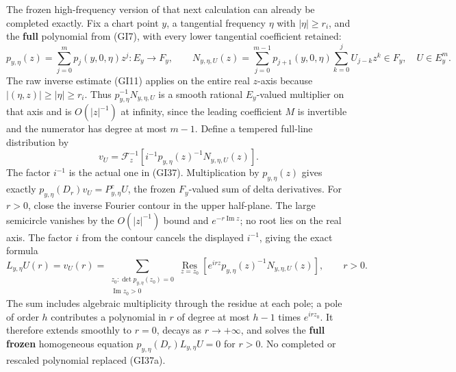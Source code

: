 \documentclass[
  11pt,
]{article}
\begin{document}
The frozen high-frequency version of that next calculation can already
be completed exactly. Fix a chart point \(y\), a tangential frequency
\(\eta\) with \(|\eta|\geq r_i\), and the \textbf{full} polynomial from
(GI7), with every lower tangential coefficient retained: \[
 p_{y,\eta}(z)=\sum_{j=0}^{m}p_j(y,0,\eta)z^j:E_y\to F_y,\qquad
 N_{y,\eta,U}(z)=
 \sum_{j=0}^{m-1}p_{j+1}(y,0,\eta)
       \sum_{k=0}^{j}U_{j-k}z^k\in F_y,\quad U\in E_y^m.
 \tag{GI37a}
\] The raw inverse estimate (GI11) applies on the entire real \(z\)-axis
because \(|(\eta,z)|\geq|\eta|\geq r_i\). Thus
\(p_{y,\eta}^{-1}N_{y,\eta,U}\) is a smooth rational \(E_y\)-valued
multiplier on that axis and is \(O(|z|^{-1})\) at infinity, since the
leading coefficient \(M\) is invertible and the numerator has degree at
most \(m-1\). Define a tempered full-line distribution by \[
 v_U=\mathcal F_z^{-1}\!\left[i^{-1}p_{y,\eta}(z)^{-1}
                         N_{y,\eta,U}(z)\right].
 \tag{GI37b}
\] The factor \(i^{-1}\) is the actual one in (GI37). Multiplication by
\(p_{y,\eta}(z)\) gives exactly \(p_{y,\eta}(D_r)v_U=P^c_{y,\eta}U\),
the frozen \(F_y\)-valued sum of delta derivatives. For \(r>0\), close
the inverse Fourier contour in the upper half-plane. The large
semicircle vanishes by the \(O(|z|^{-1})\) bound and
\(e^{-r\operatorname{Im}z}\); no root lies on the real axis. The factor
\(i\) from the contour cancels the displayed \(i^{-1}\), giving the
exact formula \[
 L_{y,\eta}U(r)=v_U(r)
 =\sum_{\substack{z_0:\det p_{y,\eta}(z_0)=0\\
                  \operatorname{Im}z_0>0}}
    \operatorname*{Res}_{z=z_0}
      \left[e^{irz}p_{y,\eta}(z)^{-1}N_{y,\eta,U}(z)\right],
 \qquad r>0.
 \tag{GI37c}
\] The sum includes algebraic multiplicity through the residue at each
pole; a pole of order \(h\) contributes a polynomial in \(r\) of degree
at most \(h-1\) times \(e^{irz_0}\). It therefore extends smoothly to
\(r=0\), decays as \(r\to+\infty\), and solves the \textbf{full frozen}
homogeneous equation \(p_{y,\eta}(D_r)L_{y,\eta}U=0\) for \(r>0\). No
completed or rescaled polynomial replaced (GI37a).
\end{document}
